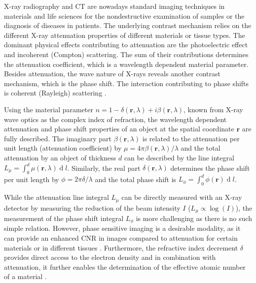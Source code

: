 \documentclass[aip,apl,amsmath,amssymb,floatfix,reprint,a4paper]{revtex4-1}
\renewcommand{\d}[1]{\ensuremath{\operatorname{d}\!{#1}}}
\begin{document}
\maketitle


X-ray radiography and \ac{CT} are nowadays standard imaging techniques in
materials and life sciences for the nondestructive examination of samples or
the diagnosis of diseases in patients. The underlying contrast mechanism
relies on the different X-ray attenuation properties of different materials
or tissue types. The dominant physical effects contributing to attenuation
are the photoelectric effect and incoherent (Compton) scattering. The sum of
their contributions determines the attenuation coefficient, which is a
wavelength dependent material parameter. Besides attenuation, the wave
nature of X-rays reveals another contrast mechanism, which is the phase
shift. The interaction contributing to phase shifts is coherent (Rayleigh)
scattering \cite{Als-Nielsen2011}.

Using the material parameter $n=1-\delta(\mathbf{r},\lambda) + i
\beta(\mathbf{r},\lambda)$, known from X-ray wave optics as the complex
index of refraction, the wavelength dependent attenuation and phase shift
properties of an object at the spatial coordinate $\mathbf{r}$ are fully
described. The imaginary part $\beta(\mathbf{r},\lambda)$ is related to the
attenuation per unit length (attenuation coefficient) by $\mu = 4 \pi
\beta(\mathbf{r},\lambda) / \lambda$ and the total attenuation by an object
of thickness $d$ can be described by the line integral $L_\mu = \int_0^d
\mu(\mathbf{r},\lambda) \d l$. Similarly, the real part
$\delta(\mathbf{r},\lambda)$ determines the phase shift per unit length by
$\phi = 2 \pi \delta / \lambda$ and the total phase shift is $L_\phi =
\int_0^d \phi(\mathbf{r}) \d l$.

While the attenuation line integral $L_\mu$ can be directly measured with an
X-ray detector by measuring the reduction of the beam intensity $I$ ($L_\mu
\propto \log(I)$), the measurement of the phase shift integral $L_\phi$ is
more challenging as there is no such simple relation. However, phase
sensitive imaging is a desirable modality, as it can provide an enhanced
\ac{CNR} in images compared to attenuation for certain
materials or in different tissues \cite{Pfeiffer2007a,McDonald2009}.
Furthermore, the refractive index decrement $\delta$ provides direct access
to the electron density \cite{Als-Nielsen2011} and in combination with
attenuation, it further enables the determination of the effective atomic
number of a material \cite{Qi2010}.
\end{document}
